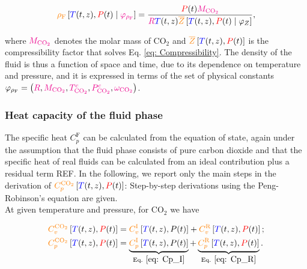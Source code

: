 \documentclass[../Article_Model_Parameters.tex]{subfiles}
\begin{document}
	{\footnotesize
	\begin{equation} \label{eq: Density}
		{\color{orange}\rho_{\text{F}}} \left[{\color{blue}T}(t,z),{\color{red}P}(t) \mid {\color{magenta}\varphi_{\rho_{\text{F}}}}\right] = \dfrac{{\color{red}P}(t) {\color{magenta}M_{\text{CO}_2}}}{{\color{magenta}R}{\color{blue}T}(t,z){\color{orange}\overline{Z}}\left[{\color{blue}T}(t,z),{\color{red}P}(t) \mid \varphi_{Z}\right]},
	\end{equation} }

	where ${\color{magenta}M_{\text{CO}_2}}$ denotes the molar mass of $\text{CO}_2$ and ${\color{orange}\overline{Z}}\left[{\color{blue}T}(t,z), {\color{red}P}(t)\right]$ is the compressibility factor that solves Eq. \eqref{eq: Compressibility}. The density of the fluid is thus a function of space and time, due to its dependence on temperature and pressure, and it is expressed in terms of the set of physical constants $\varphi_{\rho_\text{F}} = \left({\color{magenta}R}, {\color{magenta}M_{\text{CO}_2}}, {\color{magenta}T^c_{\text{CO}_2}}, {\color{magenta}P^c_{\text{CO}_2}}, {\color{magenta}\omega_{\text{CO}_2}}\right)$. \\
	
	\subsubsection{Heat capacity of the fluid phase} \label{subsubsec: Fluid heat capacity}
	
	The specific heat $C_p^{\text{F}}$ can be calculated from the equation of state, again under the assumption that the fluid phase consists of pure carbon dioxide and that the specific heat of real fluids can be calculated from an ideal contribution plus a residual term {\color{red}REF}. In the following, we report only the main steps in the derivation of ${\color{orange}C^{\text{CO}_2}_p}\left[{\color{blue}T}(t,z), {\color{red}P}(t)\right]$: Step-by-step derivations using the Peng-Robinson's equation are given.  \\
	
	At given temperature and pressure, for $\text{CO}_2$ we have
	
	{\footnotesize
	\begin{subequations}\begin{align}
			{\color{orange}C^{\text{CO}_2}_v}\left[{\color{blue}T}(t,z), {\color{red}P}(t)\right] & = {\color{orange}C_v^{\text{I}}}\left[{\color{blue}T}(t,z),P(t)\right] + {\color{orange}C_v^{\text{R}}}\left[{\color{blue}T}(t,z), {\color{red}P}(t)\right] \label{eq: Cv_CO2}; \\ 
			{\color{orange}C^{\text{CO}_2}_p}\left[{\color{blue}T}(t,z), {\color{red}P}(t)\right] & = \underbrace{{\color{orange}C_p^{\text{I}}}\left[{\color{blue}T}(t,z),P(t)\right]}_{\text{Eq. } \eqref{eq: Cp_I}} + \underbrace{{\color{orange}C_p^{\text{R}}}\left[{\color{blue}T}(t,z), {\color{red}P}(t)\right]}_{\text{Eq. } \eqref{eq: Cp_R}}  \label{eq: Cp_CO2}.
	\end{align}\end{subequations} }
\end{document}
